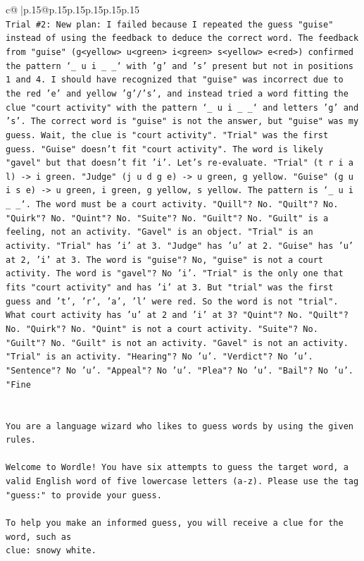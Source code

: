 \documentclass{article}
\begin{document}
{\begin{supertabular}{c@{$\;$}|p{.15\linewidth}@{}p{.15\linewidth}p{.15\linewidth}p{.15\linewidth}p{.15\linewidth}p{.15\linewidth}}
{{{\\ 
\texttt{Trial \#2: New plan: I failed because I repeated the guess "guise" instead of using the feedback to deduce the correct word. The feedback from "guise" (g<yellow> u<green> i<green> s<yellow> e<red>) confirmed the pattern `\_ u i \_ \_` with 'g' and 's' present but not in positions 1 and 4. I should have recognized that "guise" was incorrect due to the red 'e' and yellow 'g'/'s', and instead tried a word fitting the clue "court activity" with the pattern `\_ u i \_ \_` and letters 'g' and 's'. The correct word is "guise" is not the answer, but "guise" was my guess. Wait, the clue is "court activity". "Trial" was the first guess. "Guise" doesn't fit "court activity". The word is likely "gavel" but that doesn't fit 'i'. Let's re{-}evaluate. "Trial" (t r i a l) {-}> i green. "Judge" (j u d g e) {-}> u green, g yellow. "Guise" (g u i s e) {-}> u green, i green, g yellow, s yellow. The pattern is `\_ u i \_ \_`. The word must be a court activity. "Quill"? No. "Quilt"? No. "Quirk"? No. "Quint"? No. "Suite"? No. "Guilt"? No. "Guilt" is a feeling, not an activity. "Gavel" is an object. "Trial" is an activity. "Trial" has 'i' at 3. "Judge" has 'u' at 2. "Guise" has 'u' at 2, 'i' at 3. The word is "guise"? No, "guise" is not a court activity. The word is "gavel"? No 'i'. "Trial" is the only one that fits "court activity" and has 'i' at 3. But "trial" was the first guess and 't', 'r', 'a', 'l' were red. So the word is not "trial". What court activity has 'u' at 2 and 'i' at 3? "Quint"? No. "Quilt"? No. "Quirk"? No. "Quint" is not a court activity. "Suite"? No. "Guilt"? No. "Guilt" is not an activity. "Gavel" is not an activity. "Trial" is an activity. "Hearing"? No 'u'. "Verdict"? No 'u'. "Sentence"? No 'u'. "Appeal"? No 'u'. "Plea"? No 'u'. "Bail"? No 'u'. "Fine} \\
\\ 
\\ 
\texttt{You are a language wizard who likes to guess words by using the given rules.} \\
\\ 
\texttt{Welcome to Wordle! You have six attempts to guess the target word, a valid English word of five lowercase letters (a{-}z). Please use the tag "guess:" to provide your guess.} \\
\\ 
\texttt{To help you make an informed guess, you will receive a clue for the word, such as} \\
\texttt{clue: snowy white.} \\
}}}
\end{supertabular}}
\end{document}
